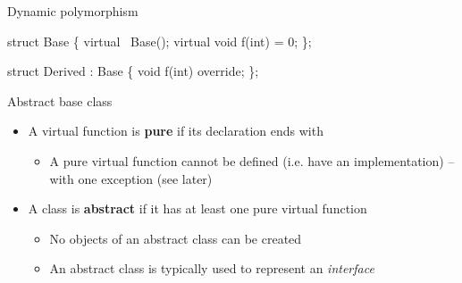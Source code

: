 \begin{frame}[fragile]{Dynamic polymorphism \insertcontinuationtext}

  \begin{codeblock}{
struct Base \{
  virtual ~Base();
  virtual void f(int) = 0;
\};

struct Derived : Base \{
  void f(int) override;
\};

}\end{codeblock}

\end{frame}

\begin{frame}{Abstract base class}

  \begin{itemize}
  \item A virtual function is \textbf{pure} if its declaration ends with
    \begin{itemize}
    \item A pure virtual function cannot be defined (i.e. have an
      implementation) -- with one exception (see later)
    \end{itemize}
  \item A class is \textbf{abstract} if it has at least one pure virtual
    function
    \begin{itemize}
    \item No objects of an abstract class can be created
    \item An abstract class is typically used to represent an \textit{interface} 
    \end{itemize}
  \end{itemize}

\end{frame}

